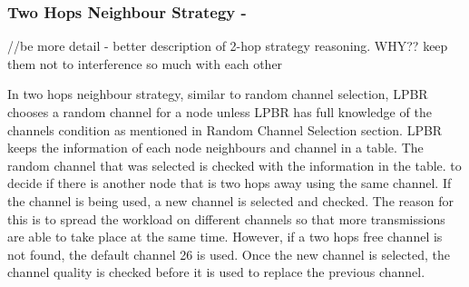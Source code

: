 	
\subsubsection{Two Hops Neighbour Strategy -}
//be more detail - better description of 2-hop strategy reasoning. WHY?? keep them not to interference so much with each other

In two hops neighbour strategy, similar to random channel selection, LPBR chooses a random channel for a node unless LPBR has full knowledge of the channels condition as mentioned in Random Channel Selection section. LPBR keeps the information of each node neighbours and channel in a table. The random channel that was selected is checked with the information in the table. to decide if there is another node that is two hops away using the same channel. If the channel is being used, a new channel is selected and checked. The reason for this is to spread the workload on different channels so that more transmissions are able to take place at the same time. However, if a two hops free channel is not found, the default channel 26 is used. Once the new channel is selected, the channel quality is checked before it is used to replace the previous channel.


